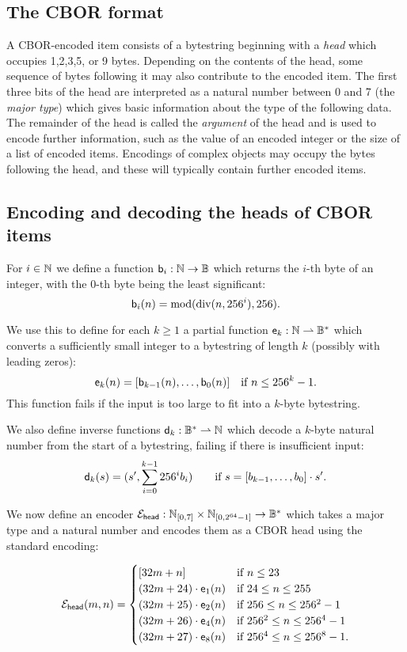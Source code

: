 \subsection{The CBOR format}
A CBOR-encoded item consists of a bytestring beginning with a \textit{head}
which occupies 1,2,3,5, or 9 bytes.  Depending on the contents of the head, some
sequence of bytes following it may also contribute to the encoded item. The
first three bits of the head are interpreted as a natural number between 0 and 7
(the \textit{major type}) which gives basic information about the type of the
following data.  The remainder of the head is called the \textit{argument} of the
head and is used to encode further information, such as the value of an encoded
integer or the size of a list of encoded items.  Encodings of complex objects
may occupy the bytes following the head, and these will typically contain
further encoded items.

\subsection{Encoding and decoding the heads of CBOR items}
For $i \in \mathbb{N}$ we define a function $\mathsf{b}_i: \mathbb{N} \rightarrow \mathbb{B}$ which returns
the $i$-th byte of an integer, with the 0-th byte being the least significant:
$$
  \mathsf{b}_i(n) = \operatorname{mod}(\operatorname{div}(n,256^i), 256).
$$

\noindent We use this to define for each $k \geq 1$ a partial function
$\mathsf{e}_k: \mathbb{N} \rightharpoonup \mathbb{B}^*$ which converts a sufficiently small
integer to a bytestring of length $k$ (possibly with leading zeros):
$$
\mathsf{e}_k(n) = [\mathsf{b}_{k-1}(n), \ldots, \mathsf{b}_0(n)]  \quad \text {if $n \leq 256^k-1$}.
$$
\noindent
This function fails if the input is too large to fit into a $k$-byte
bytestring.

We also define inverse functions $\mathsf{d}_k: \mathbb{B}^* \rightharpoonup \mathbb{N}$ which
decode a $k$-byte natural number from the start of a bytestring, failing if
there is insufficient input:
$$ \mathsf{d}_k(s) = (s', \sum_{i=0}^{k-1}256^ib_i) \qquad \text{if $s = [b_{k-1},
    \ldots, b_0] \cdot s'$}.
$$
 
\noindent We now define an encoder $\mathcal{E}_{\mathsf{head}}: \mathbb{N}_{[0,7]} \times
\mathbb{N}_{[0,2^{64}-1]} \rightarrow \mathbb{B}^*$ which takes a major type and a
natural number and encodes them as a CBOR head using the standard encoding:

$$
  \mathcal{E}_{\mathsf{head}}(m,n) =
  \begin{cases}
    [32m + n] & \text{if $n \leq 23$}\\
    (32m+24) \cdot \mathsf{e}_1(n) & \text{if $24 \leq n \leq 255$}\\
    (32m+25) \cdot \mathsf{e}_2(n) & \text{if $256 \leq n \leq 256^2-1$}\\
    (32m+26) \cdot \mathsf{e}_4(n)& \text{if $256^2 \leq n \leq 256^4-1$}\\
    (32m+27) \cdot \mathsf{e}_8(n) & \text{if $256^4 \leq n \leq 256^8-1$}.
  \end{cases}
$$

